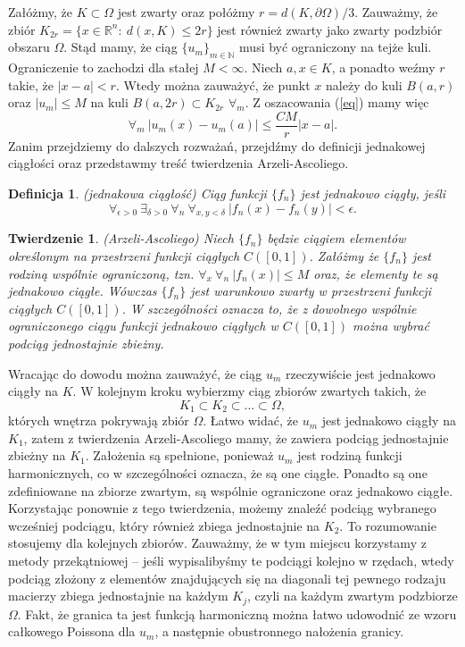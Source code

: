 \documentclass[12pt]{article}
\newtheorem{theorem}{Twierdzenie}
\newtheorem{definition}{Definicja}
\begin{document}
Załóżmy, że $K \subset \Omega$ jest zwarty oraz połóżmy $r=d(K,\partial \Omega)/3$. Zauważmy, że zbiór $K_{2r}=\{ x \in \mathbb{R}^n:  \ d(x,K)\leq 2r\}$ jest również zwarty jako zwarty podzbiór obszaru $\Omega$. Stąd mamy, że ciąg $\{u_m\}_{m \in \mathbb{N}}$ musi być ograniczony na tejże kuli. Ograniczenie to zachodzi dla stałej $M< \infty$. Niech $a, x \in K$, a ponadto weźmy $r$ takie, że $|x-a|<r$. Wtedy można zauważyć, że punkt $x$ należy do kuli $B(a,r)$ oraz $|u_m|\leq M$ na kuli $ B(a, 2r) \subset K_{2r}$ $\forall_m$. Z oszacowania (\ref{eq}) mamy więc 
\begin{equation*}
\forall_m \ |u_m(x)-u_m(a)| \leq \dfrac{CM}{r}|x-a|.
\end{equation*}
Zanim przejdziemy do dalszych rozważań, przejdźmy do definicji jednakowej ciągłości oraz przedstawmy treść twierdzenia Arzeli-Ascoliego.
\begin{definition}{(jednakowa ciągłość)}
Ciąg funkcji $\{ f_n\}$ jest jednakowo ciągły, jeśli 
$$\forall_{\epsilon>0}\ \exists_{\delta>0}\ \forall_n \ \forall_{x,y<\delta} \ |f_n(x)-f_n(y)|<\epsilon. $$
\end{definition}
\begin{theorem}{(Arzeli-Ascoliego)} Niech $\{f_n\}$ będzie ciągiem elementów określonym na przestrzeni funkcji ciągłych $C([0,1])$. Załóżmy że $\{f_n\}$ jest rodziną wspólnie ograniczoną, tzn. $\forall_x \ \forall_n \ |f_n(x)|\leq M$ oraz, że elementy te są jednakowo ciągłe. Wówczas $\{f_n\}$ jest warunkowo zwarty w przestrzeni funkcji ciągłych $C([0,1])$.  W szczególności oznacza to, że z dowolnego wspólnie ograniczonego ciągu funkcji jednakowo ciągłych w  $C([0,1])$ można wybrać podciąg jednostajnie zbieżny.
\end{theorem}
Wracając do dowodu można zauważyć, że ciąg $u_m$ rzeczywiście jest jednakowo ciągły na $K$. W kolejnym kroku wybierzmy ciąg zbiorów zwartych takich, że 
$$ K_1 \subset K_2 \subset \ldots \subset \Omega ,$$
których wnętrza pokrywają zbiór $\Omega$. Łatwo widać, że $u_m$ jest jednakowo ciągły na $K_1$, zatem z  twierdzenia Arzeli-Ascoliego mamy, że zawiera podciąg jednostajnie zbieżny na $K_1$. Założenia są spełnione, ponieważ $u_m$ jest rodziną funkcji harmonicznych, co w szczególności oznacza, że są one ciągłe.  Ponadto są one zdefiniowane na zbiorze zwartym, są wspólnie ograniczone oraz jednakowo ciągłe.  Korzystając ponownie z tego twierdzenia, możemy znaleźć podciąg wybranego wcześniej podciągu, który również zbiega jednostajnie na $K_2$. To rozumowanie stosujemy dla kolejnych zbiorów. Zauważmy, że w tym miejscu korzystamy z metody przekątniowej -- jeśli wypisalibyśmy te podciągi kolejno w rzędach, wtedy podciąg złożony z elementów znajdujących się na diagonali tej pewnego rodzaju macierzy zbiega jednostajnie na każdym $K_j$, czyli na każdym zwartym podzbiorze $\Omega$. Fakt, że granica ta jest funkcją harmoniczną można łatwo udowodnić ze wzoru całkowego Poissona dla $u_m$, a następnie obustronnego nałożenia granicy.
\end{document}
